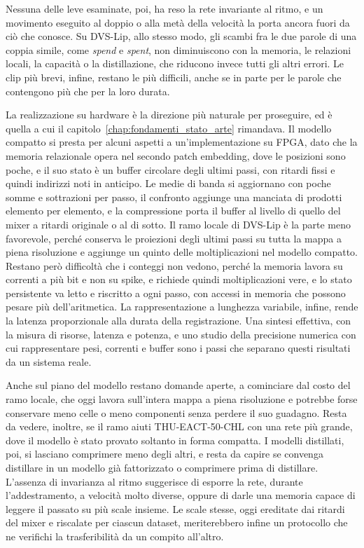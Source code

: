 Nessuna delle leve esaminate, poi, ha reso la rete invariante al ritmo, e un movimento eseguito al doppio o alla metà della velocità la porta ancora fuori da ciò che conosce. Su DVS-Lip, allo stesso modo, gli scambi fra le due parole di una coppia simile, come \emph{spend} e \emph{spent}, non diminuiscono con la memoria, le relazioni locali, la capacità o la distillazione, che riducono invece tutti gli altri errori. Le clip più brevi, infine, restano le più difficili, anche se in parte per le parole che contengono più che per la loro durata.

La realizzazione su hardware è la direzione più naturale per proseguire, ed è quella a cui il capitolo~\ref{chap:fondamenti_stato_arte} rimandava. Il modello compatto si presta per alcuni aspetti a un'implementazione su FPGA, dato che la memoria relazionale opera nel secondo patch embedding, dove le posizioni sono poche, e il suo stato è un buffer circolare degli ultimi passi, con ritardi fissi e quindi indirizzi noti in anticipo. Le medie di banda si aggiornano con poche somme e sottrazioni per passo, il confronto aggiunge una manciata di prodotti elemento per elemento, e la compressione porta il buffer al livello di quello del mixer a ritardi originale o al di sotto. Il ramo locale di DVS-Lip è la parte meno favorevole, perché conserva le proiezioni degli ultimi passi su tutta la mappa a piena risoluzione e aggiunge un quinto delle moltiplicazioni nel modello compatto. Restano però difficoltà che i conteggi non vedono, perché la memoria lavora su correnti a più bit e non su spike, e richiede quindi moltiplicazioni vere, e lo stato persistente va letto e riscritto a ogni passo, con accessi in memoria che possono pesare più dell'aritmetica. La rappresentazione a lunghezza variabile, infine, rende la latenza proporzionale alla durata della registrazione. Una sintesi effettiva, con la misura di risorse, latenza e potenza, e uno studio della precisione numerica con cui rappresentare pesi, correnti e buffer sono i passi che separano questi risultati da un sistema reale.

Anche sul piano del modello restano domande aperte, a cominciare dal costo del ramo locale, che oggi lavora sull'intera mappa a piena risoluzione e potrebbe forse conservare meno celle o meno componenti senza perdere il suo guadagno. Resta da vedere, inoltre, se il ramo aiuti THU-EACT-50-CHL con una rete più grande, dove il modello è stato provato soltanto in forma compatta. I modelli distillati, poi, si lasciano comprimere meno degli altri, e resta da capire se convenga distillare in un modello già fattorizzato o comprimere prima di distillare. L'assenza di invarianza al ritmo suggerisce di esporre la rete, durante l'addestramento, a velocità molto diverse, oppure di darle una memoria capace di leggere il passato su più scale insieme. Le scale stesse, oggi ereditate dai ritardi del mixer e riscalate per ciascun dataset, meriterebbero infine un protocollo che ne verifichi la trasferibilità da un compito all'altro.

